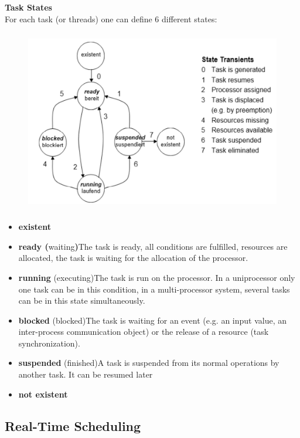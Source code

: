 {\rot\bf Task States}\\

For each task (or threads) one can define 6 different states:

	\begin{figure}[h]
    \centering
    \includegraphics[width=13cm, height=8cm]{Images/image82.png}
    \label{fig:Fig }
    \end{figure}

\begin{itemize}
	\item  \textbf{existent}
	\item \textbf{ ready (}waiting\textbf{)}The task is ready, all conditions are fulfilled, resources are allocated, the task is waiting for the allocation of the processor.
	\item  \textbf{running }(executing)The task is run on the processor. In a uniprocessor only one task can be in this condition, in a multi-processor system, several tasks can be in this state simultaneously. 
	\item  \textbf{blocked} (blocked)The task is waiting for an event (e.g. an input value, an inter-process communication object) or the release of a resource (task synchronization). 
	\item  \textbf{suspended }(finished)A task is suspended from its normal operations by another task. It can be resumed later
	\item  \textbf{not existent}
\end{itemize}

\subsection{Real-Time Scheduling}

